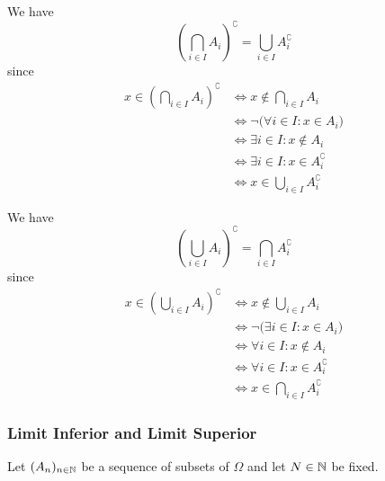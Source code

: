 \begin{minipage}[t]{0.48\textwidth}
We have
\begin{equation}\label{eq:demorgan-intersection}
\left(\bigcap_{i\in I} A_i\right)^\complement
=
\bigcup_{i\in I} A_i^\complement
\end{equation}
since
\[
\begin{aligned}
x\in \left(\bigcap_{i\in I} A_i\right)^\complement
&\iff x\notin \bigcap_{i\in I} A_i\\
&\iff \neg\bigl(\forall i\in I : x \in A_i\bigr)\\
&\iff \exists i\in I : x \notin A_i\\
&\iff \exists i\in I : x \in A_i^\complement\\
&\iff x\in \bigcup_{i\in I} A_i^\complement
\end{aligned}
\]
\end{minipage}
\hfill
\begin{minipage}[t]{0.48\textwidth}
We have
\begin{equation}\label{eq:demorgan-union}
\left(\bigcup_{i\in I} A_i\right)^\complement
=
\bigcap_{i\in I} A_i^\complement
\end{equation}
since
\[
\begin{aligned}
x\in \left(\bigcup_{i\in I} A_i\right)^\complement
&\iff x\notin \bigcup_{i\in I} A_i\\
&\iff \neg\bigl(\exists i\in I : x\in A_i\bigr)\\
&\iff \forall i\in I : x \notin A_i\\
&\iff \forall i\in I : x \in A_i^\complement\\
&\iff x\in \bigcap_{i\in I} A_i^\complement
\end{aligned}
\]
\end{minipage}


\subsubsection*{Limit Inferior and Limit Superior}

Let $(A_n)_{n\in\mathbb{N}}$ be a sequence of subsets of $\Omega$ and let $N\in\mathbb{N}$ be fixed.

